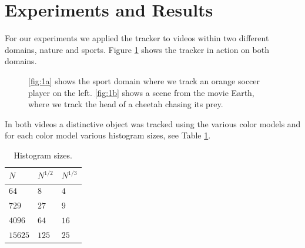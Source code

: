 \documentclass[11pt]{article}
\begin{document}
\section{Experiments and Results} \label{sec:results}
For our experiments we applied the tracker to videos within two different
domains, nature and sports. Figure \ref{fig:videos} shows the tracker in action
on both domains. 
\begin{figure}[!ht]
\centering
{}
\caption{\ref{fig:1a} shows the sport domain where we track an orange soccer
player on the left. \ref{fig:1b} shows a scene from the movie Earth, where we
track the head of a cheetah chasing its prey.}
\label{fig:videos}
\end{figure}
In both videos a distinctive object was tracked using the various color models
and for each color model various histogram sizes, see Table \ref{table:bins}.
\begin{table}[!ht]
\centering
\begin{tabular}{l|l|l}
$N$     & $N^{1/2}$ & $N^{1/3}$\\\hline
$64$    & $8$       & $4$\\\hline
$729$   & $27$      & $9$\\\hline
$4096$  & $64$      & $16$\\\hline
$15625$ & $125$     & $25$\\
\end{tabular}
\caption{Histogram sizes.}
\label{table:bins}
\end{table}
\end{document}
